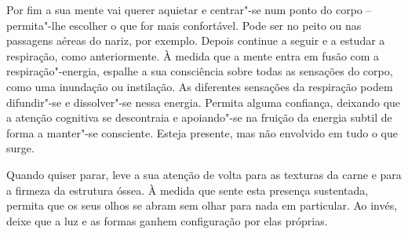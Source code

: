 \enlargethispage{\baselineskip}

Por fim a sua mente vai querer aquietar e centrar"-se num ponto do corpo --
permita"-lhe escolher o que for mais confortável. Pode ser no peito ou nas
passagens aéreas do nariz, por exemplo. Depois continue a seguir e a estudar a
respiração, como anteriormente. À medida que a mente entra em fusão com a
respiração"-energia, espalhe a sua consciência sobre todas as sensações do corpo,
como uma inundação ou instilação. As diferentes sensações da respiração podem
difundir"-se e dissolver"-se nessa energia. Permita alguma confiança, deixando que
a atenção cognitiva se descontraia e apoiando"-se na fruição da energia subtil de
forma a manter"-se consciente. Esteja presente, mas não envolvido em tudo o que
surge.

Quando quiser parar, leve a sua atenção de volta para as texturas da carne e
para a firmeza da estrutura óssea. À medida que sente esta presença sustentada,
permita que os seus olhos se abram sem olhar para nada em particular. Ao invés,
deixe que a luz e as formas ganhem configuração por elas próprias.
